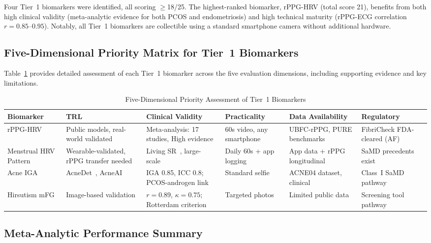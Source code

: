 \documentclass[conference]{IEEEtran}
\begin{document}
Four Tier~1 biomarkers were identified, all scoring $\geq$18/25. The highest-ranked biomarker, rPPG-HRV (total score 21), benefits from both high clinical validity (meta-analytic evidence for both PCOS and endometriosis) and high technical maturity (rPPG-ECG correlation $r=0.85$--$0.95$). Notably, all Tier~1 biomarkers are collectible using a standard smartphone camera without additional hardware.

\subsection{Five-Dimensional Priority Matrix for Tier~1 Biomarkers}

Table~\ref{tab:priority} provides detailed assessment of each Tier~1 biomarker across the five evaluation dimensions, including supporting evidence and key limitations.

\begin{table}[t]
\centering
\caption{Five-Dimensional Priority Assessment of Tier~1 Biomarkers}
\label{tab:priority}
\begin{tabular}{p{2.8cm}p{2.5cm}p{2.5cm}p{2.5cm}p{2.5cm}p{2.5cm}}
\toprule
\textbf{Biomarker} & \textbf{TRL} & \textbf{Clinical Validity} & \textbf{Practicality} & \textbf{Data Availability} & \textbf{Regulatory} \\
\midrule
rPPG-HRV & Public models, real-world validated~\cite{debnath2025comprehensive} & Meta-analysis: 17 studies, High evidence~\cite{Mirzohreh_2024} & 60s video, any smartphone & UBFC-rPPG, PURE benchmarks & FibriCheck FDA-cleared (AF)~\cite{Sollee_2025} \\
\addlinespace
Menstrual HRV Pattern & Wearable-validated, rPPG transfer needed & Living SR~\cite{de_Jager_2026}, large-scale~\cite{Heydari_2025} & Daily 60s + app logging & App data + rPPG longitudinal & SaMD precedents exist \\
\addlinespace
Acne IGA & AcneDet~\cite{Huynh_2022}, AcneAI~\cite{Gazeau_2024} & IGA 0.85, ICC 0.8; PCOS-androgen link & Standard selfie & ACNE04 dataset, clinical & Class~I SaMD pathway \\
\addlinespace
Hirsutism mFG & Image-based validation~\cite{Oliveira_2022} & $r=0.89$, $\kappa=0.75$; Rotterdam criterion & Targeted photos & Limited public data & Screening tool pathway \\
\bottomrule
\end{tabular}
\end{table}

\subsection{Meta-Analytic Performance Summary}
\end{document}
